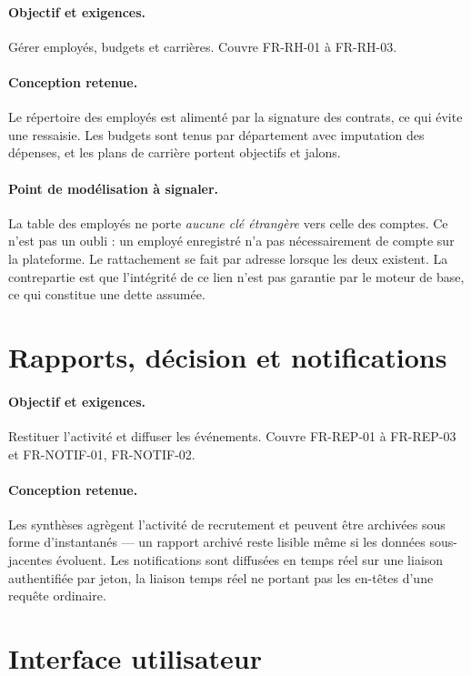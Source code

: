 \paragraph{Objectif et exigences.} Gérer employés, budgets et carrières.
Couvre FR-RH-01 à FR-RH-03.

\paragraph{Conception retenue.} Le répertoire des employés est alimenté par la
signature des contrats, ce qui évite une ressaisie. Les budgets sont tenus par
département avec imputation des dépenses, et les plans de carrière portent
objectifs et jalons.

\paragraph{Point de modélisation à signaler.} La table des employés ne porte
\emph{aucune clé étrangère} vers celle des comptes. Ce n'est pas un oubli :
un employé enregistré n'a pas nécessairement de compte sur la plateforme. Le
rattachement se fait par adresse lorsque les deux existent. La contrepartie
est que l'intégrité de ce lien n'est pas garantie par le moteur de base, ce qui
constitue une dette assumée.

\section{Rapports, décision et notifications}
\label{sec:impl_reporting}

\paragraph{Objectif et exigences.} Restituer l'activité et diffuser les
événements. Couvre FR-REP-01 à FR-REP-03 et FR-NOTIF-01, FR-NOTIF-02.

\paragraph{Conception retenue.} Les synthèses agrègent l'activité de
recrutement et peuvent être archivées sous forme d'instantanés — un rapport
archivé reste lisible même si les données sous-jacentes évoluent. Les
notifications sont diffusées en temps réel sur une liaison authentifiée par
jeton, la liaison temps réel ne portant pas les en-têtes d'une requête
ordinaire.

\section{Interface utilisateur}
\label{sec:impl_frontend}

